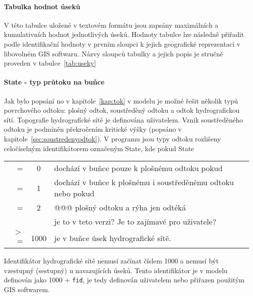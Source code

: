 




\paragraph{Tabulka hodnot úseků}\label{sec:toktext}
V této tabulce uložené v textovém formátu jsou zapsány maximálních a kumulativních hodnot jednotlivých úseků. Hodnoty tabulce lze následně přiřadit podle identifikační hodnoty v prvním sloupci k jejich geografické reprezentaci v libovolném GIS softwaru. Názvy sloupců tabulky a jejich popis je stručně proveden v tabulce~\ref{tab:useky}






\paragraph{State - typ průtoku na buňce}\label{sec:statpopis}
  Jak bylo popsání no v kapitole~\ref{kap:tok} v modelu je možné řešit několik typů povrchového odtoku: plošný odtok, soustředěný odtoku a odtok hydrografickou sítí. Topografie hydrografické sítě je definována uživatelem. Vznik soustředěného odtoku je podmíněn překročením kritické výšky (popsáno v kapitole~\ref{sec:soustredenyodtok}). V programu jsou typy odtoku rozlišeny celočíselným identifikátorem označeným State, kde pokud State\\
%   
  \begin{tabular}{rcl}
     =     &0&  dochází v buňce pouze k plošnému odtoku pokud \\
     =     &1&  dochází v buňce k plošnému i soustředěnému odtoku  nebo pokud \\
     =     &2&  @@@ plošný odtoku a rýha jen odtéká \\
     && je to v teto verzi? Je to zajímavé pro uživatele? \\
     $>$=  &1000&  je v buňce úsek hydrografické sítě. \\
  \end{tabular}

  Identifikátor hydrografické sítě nemusí začínat číslem 1000 a nemusí být vzestupný (sestupný) u navazujících úseků. Tento identifikátor je v modelu definován jako 1000 + {\tt fid}, je tedy definován uživatelem nebo přiřazen použitým GIS softwarem. 





